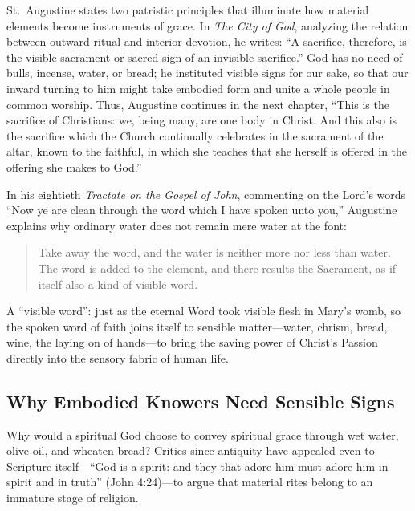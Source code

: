 St.\ Augustine states two patristic principles that illuminate how material elements become instruments of grace. In \textit{The City of God}, analyzing the relation between outward ritual and interior devotion, he writes: ``A sacrifice, therefore, is the visible sacrament or sacred sign of an invisible sacrifice.'' God has no need of bulls, incense, water, or bread; he instituted visible signs for our sake, so that our inward turning to him might take embodied form and unite a whole people in common worship. Thus, Augustine continues in the next chapter, ``This is the sacrifice of Christians: we, being many, are one body in Christ. And this also is the sacrifice which the Church continually celebrates in the sacrament of the altar, known to the faithful, in which she teaches that she herself is offered in the offering she makes to God.''

In his eightieth \textit{Tractate on the Gospel of John}, commenting on the Lord's words ``Now ye are clean through the word which I have spoken unto you,'' Augustine explains why ordinary water does not remain mere water at the font:

\begin{quote}
Take away the word, and the water is neither more nor less than water. The word is added to the element, and there results the Sacrament, as if itself also a kind of visible word.
\end{quote}

A ``visible word'': just as the eternal Word took visible flesh in Mary's womb, so the spoken word of faith joins itself to sensible matter---water, chrism, bread, wine, the laying on of hands---to bring the saving power of Christ's Passion directly into the sensory fabric of human life.

\subsection{Why Embodied Knowers Need Sensible Signs}

Why would a spiritual God choose to convey spiritual grace through wet water, olive oil, and wheaten bread? Critics since antiquity have appealed even to Scripture itself---``God is a spirit: and they that adore him must adore him in spirit and in truth'' (John 4:24)---to argue that material rites belong to an immature stage of religion.

